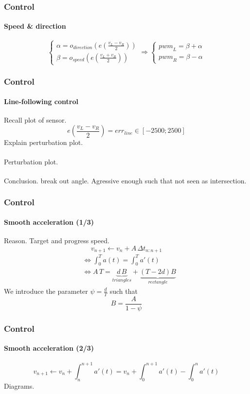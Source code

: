 \documentclass{beamer}
\begin{document}

\begin{frame}
\frametitle{Control}
\framesubtitle{Speed \& direction}
$$ 
\left\{
    \begin{array}{ll}
		\alpha = o_{direction}(e(\frac{v_L - v_R}{2})) \\[0.3cm]
		\beta = o_{speed}(e(\frac{v_L + v_R}{2}))
	\end{array}
\right.
\Rightarrow
\left\{
    \begin{array}{ll}
		{pwm}_L =  \beta + \alpha \\
		{pwm}_R = \beta - \alpha
	\end{array}
\right.
$$
\end{frame}


\begin{frame}
\frametitle{Control}
\framesubtitle{Line-following control}
Recall plot of sensor. 
$$ 
e(\frac{v_L - v_R}{2})=err_{line} \in [-2500;2500]
$$
Explain perturbation plot.\\~\\
Perturbation plot.\\~\\
Conclusion. break out angle. Agressive enough such that not seen as intersection.
\end{frame}


\begin{frame}
\frametitle{Control}
\framesubtitle{Smooth acceleration (1/3)}
Reason. Target and progress speed.
$$
v_{n+1} \leftarrow v_n + A \, \Delta t_{n:n+1}
$$
\begin{align*}
&\Leftrightarrow \int_{0}^{T}a(t) =  \int_{0}^{T}a'(t) \\
&\Leftrightarrow A\,T = \underbrace{d\,B}_{triangles} + \underbrace{(T - 2d)B}_{rectangle}
\end{align*}
We introduce the parameter $\psi = \frac{d}{T}$ such that
$$
B = \frac{A}{1-\psi} 
$$
\end{frame}


\begin{frame}
\frametitle{Control}
\framesubtitle{Smooth acceleration (2/3)}
$$
v_{n+1} \leftarrow v_n + \int_{n}^{n+1}a'(t) = v_n + \int_{0}^{n+1}a'(t) - \int_{0}^{n}a'(t)
$$
Diagrams.
\end{frame}
\end{document}
